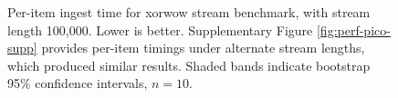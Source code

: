 \begin{figure}
\resizebox{\linewidth}{!}{%
%
}
\caption{%
Per-item ingest time for xorwow stream benchmark, with stream length 100,000.
\footnotesize
Lower is better.
Supplementary Figure \ref{fig:perf-pico-supp} provides per-item timings under alternate stream lengths, which produced similar results.
Shaded bands indicate bootstrap 95\% confidence intervals, $n=10$.
}
\label{fig:pico-performance}
\end{figure}
